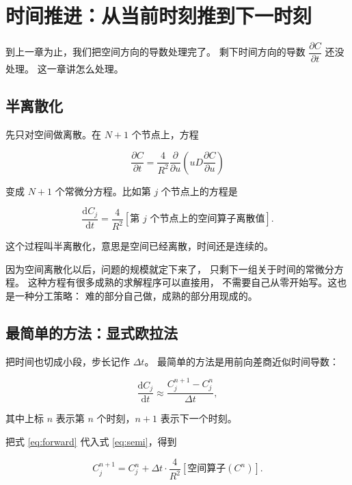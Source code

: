 \section{时间推进：从当前时刻推到下一时刻}

到上一章为止，我们把空间方向的导数处理完了。
剩下时间方向的导数 $\dfrac{\partial C}{\partial t}$ 还没处理。
这一章讲怎么处理。

\subsection{半离散化}

先只对空间做离散。在 $N+1$ 个节点上，方程

\begin{equation}
\frac{\partial C}{\partial t}=\frac{4}{R^2}\frac{\partial}{\partial u}\left(uD\frac{\partial C}{\partial u}\right)
\end{equation}

变成 $N+1$ 个常微分方程。比如第 $j$ 个节点上的方程是

\begin{equation}
\frac{\mathrm{d}C_j}{\mathrm{d}t}
= \frac{4}{R^2}\left[\text{第 }j\text{ 个节点上的空间算子离散值}\right].
\label{eq:semi}
\end{equation}

这个过程叫半离散化，意思是空间已经离散，时间还是连续的。

因为空间离散化以后，问题的规模就定下来了，
只剩下一组关于时间的常微分方程。
这种方程有很多成熟的求解程序可以直接用，
不需要自己从零开始写。这也是一种分工策略：
难的部分自己做，成熟的部分用现成的。

\subsection{最简单的方法：显式欧拉法}

把时间也切成小段，步长记作 $\Delta t$。
最简单的方法是用前向差商近似时间导数：

\begin{equation}
\frac{\mathrm{d}C_j}{\mathrm{d}t}\approx\frac{C_j^{n+1}-C_j^{n}}{\Delta t},
\label{eq:forward}
\end{equation}

其中上标 $n$ 表示第 $n$ 个时刻，$n+1$ 表示下一个时刻。

把式 \eqref{eq:forward} 代入式 \eqref{eq:semi}，得到

\begin{equation}
C_j^{n+1} = C_j^{n} + \Delta t\cdot
\frac{4}{R^2}\left[\text{空间算子}(C^n)\right].
\label{eq:euler}
\end{equation}

